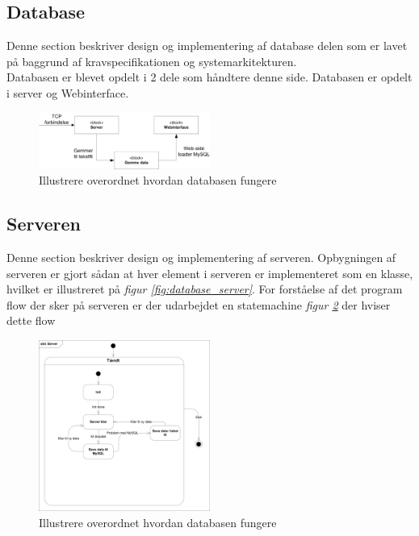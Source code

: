 \subsection{Database}
Denne section beskriver design og implementering af database delen som er lavet på baggrund af kravspecifikationen og systemarkitekturen.\\
Databasen er blevet opdelt i 2 dele som håndtere denne side. Databasen er opdelt i server og Webinterface.
\begin{figure}[H]
\centering
\includegraphics[width = 0.5\textwidth]{billeder/database_to_mysql}
\caption{Illustrere overordnet hvordan databasen fungere}
\label{fig:server_to_mysql}
\end{figure}

\subsection{Serveren}
Denne section beskriver design og implementering af serveren.
Opbygningen af serveren er gjort sådan at hver element i serveren er implementeret som en klasse, hvilket er illustreret på \textit{figur \ref{fig:database_server}}. For forståelse af det program flow der sker på serveren er der udarbejdet en statemachine \textit{figur \ref{fig:stm_server}} der hviser dette flow
\begin{figure}[H]
\centering
\includegraphics[width = 0.5\textwidth]{billeder/Systemarkitektur/stm_server}
\caption{Illustrere overordnet hvordan databasen fungere}
\label{fig:stm_server}
\end{figure}

